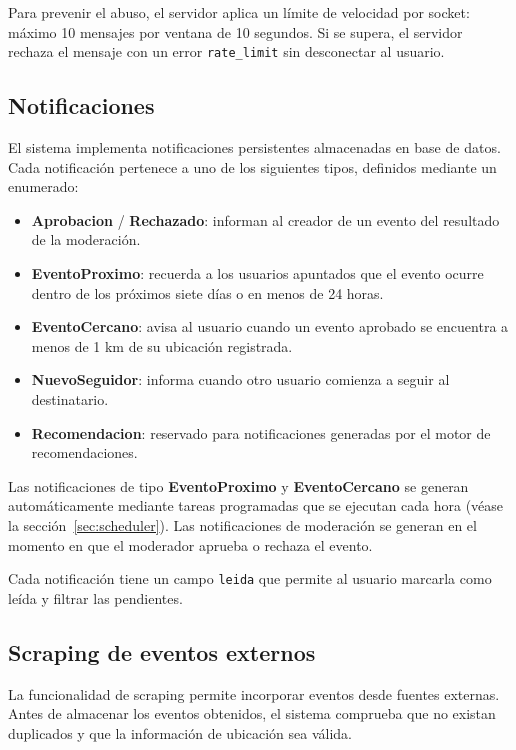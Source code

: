 Para prevenir el abuso, el servidor aplica un límite de velocidad por socket: máximo 10 mensajes por ventana de 10 segundos. Si se supera, el servidor rechaza el mensaje con un error \texttt{rate\_limit} sin desconectar al usuario.

\subsection{Notificaciones}

El sistema implementa notificaciones persistentes almacenadas en base de datos. Cada notificación pertenece a uno de los siguientes tipos, definidos mediante un enumerado:

\begin{itemize}
    \item \textbf{Aprobacion} / \textbf{Rechazado}: informan al creador de un evento del resultado de la moderación.
    \item \textbf{EventoProximo}: recuerda a los usuarios apuntados que el evento ocurre dentro de los próximos siete días o en menos de 24 horas.
    \item \textbf{EventoCercano}: avisa al usuario cuando un evento aprobado se encuentra a menos de 1 km de su ubicación registrada.
    \item \textbf{NuevoSeguidor}: informa cuando otro usuario comienza a seguir al destinatario.
    \item \textbf{Recomendacion}: reservado para notificaciones generadas por el motor de recomendaciones.
\end{itemize}

Las notificaciones de tipo \textbf{EventoProximo} y \textbf{EventoCercano} se generan automáticamente mediante tareas programadas que se ejecutan cada hora (véase la sección~\ref{sec:scheduler}). Las notificaciones de moderación se generan en el momento en que el moderador aprueba o rechaza el evento.

Cada notificación tiene un campo \texttt{leida} que permite al usuario marcarla como leída y filtrar las pendientes.

\subsection{Scraping de eventos externos}

La funcionalidad de scraping permite incorporar eventos desde fuentes externas. Antes de almacenar los eventos obtenidos, el sistema comprueba que no existan duplicados y que la información de ubicación sea válida.

